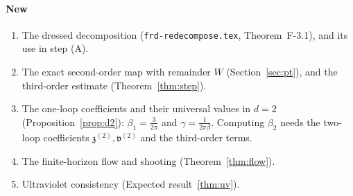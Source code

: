\documentclass[11pt]{amsart}
\theoremstyle{definition}
\theoremstyle{remark}
\numberwithin{equation}{section}
\newcommand{\frd}{\texttt{frd-redecompose.tex}}
\begin{document}
\paragraph{New}
\begin{enumerate}
\item The dressed decomposition (\frd{}, Theorem~F-3.1), and its use in step (A).
\item The exact second-order map with remainder $W$ (Section~\ref{sec:pt}), and the third-order
  estimate (Theorem~\ref{thm:step}).
\item The one-loop coefficients and their universal values in $d=2$ (Proposition~\ref{prop:d2}):
  $\beta_1=\frac3{2\pi}$ and $\gamma=\frac1{2\pi\beta}$. Computing $\beta_2$ needs the two-loop
  coefficients $\mathfrak z^{(2)},\mathfrak v^{(2)}$ and the third-order terms.
\item The finite-horizon flow and shooting (Theorem~\ref{thm:flow}).
\item Ultraviolet consistency (Expected result~\ref{thm:uv}).
\end{enumerate}
\end{document}
